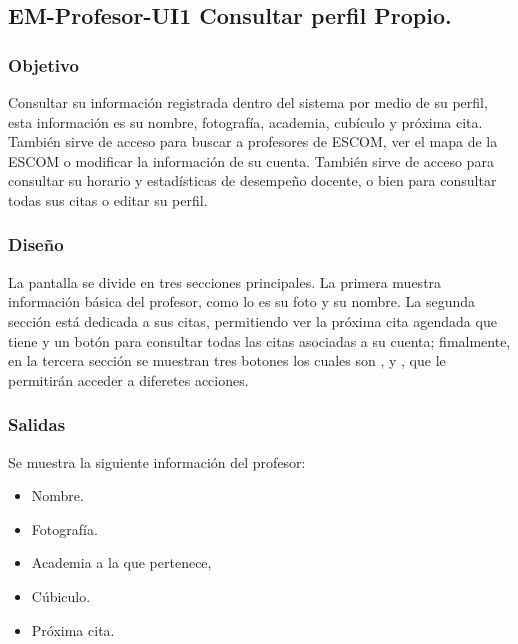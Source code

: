 

\pagebreak
\subsection{EM-Profesor-UI1 Consultar perfil Propio.}

\subsubsection{Objetivo}
	\noindent
	Consultar su información registrada dentro del sistema por medio de su perfil, esta información es su nombre, fotografía, academia, cubículo y próxima cita. También sirve de acceso para buscar a profesores de ESCOM, ver el mapa de la ESCOM o modificar la información de su cuenta. También sirve de acceso para consultar su horario y estadísticas de desempeño docente, o bien para consultar todas sus citas o editar su perfil.  

\subsubsection{Diseño}
	\noindent
	La pantalla se divide en tres secciones principales. La primera muestra información básica del profesor, como lo es su foto y su nombre. La segunda sección está dedicada a sus citas, permitiendo ver la próxima cita agendada que tiene y un botón para consultar todas las citas asociadas a su cuenta; fimalmente, en la tercera sección se muestran tres botones los cuales son ,  y , que le permitirán acceder a diferetes acciones. 
 
\pagebreak
{}

\subsubsection{Salidas}
	Se muestra la siguiente información del profesor:
	\begin{itemize}
		\item Nombre.
		\item Fotografía.
		\item Academia a la que pertenece,
		\item Cúbiculo.
		\item Próxima cita.
	\end{itemize}

